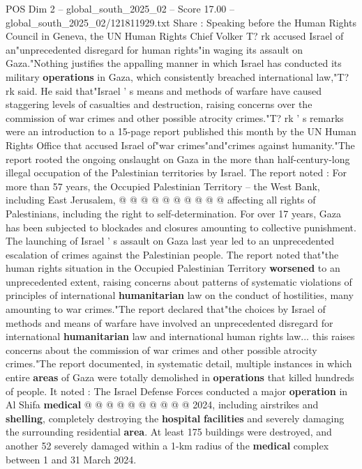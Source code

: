 \begin{textsample}{POS Dim 2 – global\_south\_2025\_02 – Score 17.00 – global\_south\_2025\_02/121811929.txt}  \label{ex:f2_pos_428}
Share : Speaking before the Human Rights Council in Geneva, the UN Human Rights Chief Volker T? rk accused Israel of an"unprecedented disregard for human rights"in waging its assault on Gaza."Nothing justifies the appalling manner in which Israel has conducted its military \textbf{operations} in Gaza, which consistently breached international law,"T? rk said.
He said that"Israel ' s means and methods of warfare have caused staggering levels of casualties and destruction, raising concerns over the commission of war crimes and other possible atrocity crimes."T? rk ' s remarks were an introduction to a 15-page report published this month by the UN Human Rights Office that accused Israel of"war crimes"and"crimes against humanity."The report rooted the ongoing onslaught on Gaza in the more than half-century-long illegal occupation of the Palestinian territories by Israel.
The report noted : For more than 57 years, the Occupied Palestinian Territory -- the West Bank, including East Jerusalem, @ @ @ @ @ @ @ @ @ @ affecting all rights of Palestinians, including the right to self-determination.
For over 17 years, Gaza has been subjected to blockades and closures amounting to collective punishment.
The launching of Israel ' s assault on Gaza last year led to an unprecedented escalation of crimes against the Palestinian people.
The report noted that"the human rights situation in the Occupied Palestinian Territory \textbf{worsened} to an unprecedented extent, raising concerns about patterns of systematic violations of principles of international \textbf{humanitarian} law on the conduct of hostilities, many amounting to war crimes."The report declared that"the choices by Israel of methods and means of warfare have involved an unprecedented disregard for international \textbf{humanitarian} law and international human rights law... this raises concerns about the commission of war crimes and other possible atrocity crimes."The report documented, in systematic detail, multiple instances in which entire \textbf{areas} of Gaza were totally demolished in \textbf{operations} that killed hundreds of people.
It noted : The Israel Defense Forces conducted a major \textbf{operation} in Al Shifa \textbf{medical} @ @ @ @ @ @ @ @ @ @ 2024, including airstrikes and \textbf{shelling}, completely destroying the \textbf{hospital} \textbf{facilities} and severely damaging the surrounding residential \textbf{area}.
At least 175 buildings were destroyed, and another 52 severely damaged within a 1-km radius of the \textbf{medical} complex between 1 and 31 March 2024.

\end{textsample}
